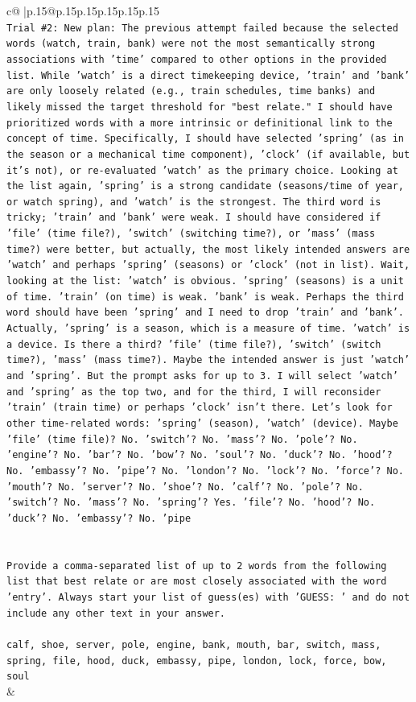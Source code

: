 \documentclass{article}
\begin{document}
{\begin{supertabular}{c@{$\;$}|p{.15\linewidth}@{}p{.15\linewidth}p{.15\linewidth}p{.15\linewidth}p{.15\linewidth}p{.15\linewidth}}
{{{\\ 
\texttt{Trial \#2: New plan: The previous attempt failed because the selected words (watch, train, bank) were not the most semantically strong associations with 'time' compared to other options in the provided list. While 'watch' is a direct timekeeping device, 'train' and 'bank' are only loosely related (e.g., train schedules, time banks) and likely missed the target threshold for "best relate." I should have prioritized words with a more intrinsic or definitional link to the concept of time. Specifically, I should have selected 'spring' (as in the season or a mechanical time component), 'clock' (if available, but it's not), or re{-}evaluated 'watch' as the primary choice. Looking at the list again, 'spring' is a strong candidate (seasons/time of year, or watch spring), and 'watch' is the strongest. The third word is tricky; 'train' and 'bank' were weak. I should have considered if 'file' (time file?), 'switch' (switching time?), or 'mass' (mass time?) were better, but actually, the most likely intended answers are 'watch' and perhaps 'spring' (seasons) or 'clock' (not in list). Wait, looking at the list: 'watch' is obvious. 'spring' (seasons) is a unit of time. 'train' (on time) is weak. 'bank' is weak. Perhaps the third word should have been 'spring' and I need to drop 'train' and 'bank'. Actually, 'spring' is a season, which is a measure of time. 'watch' is a device. Is there a third? 'file' (time file?), 'switch' (switch time?), 'mass' (mass time?). Maybe the intended answer is just 'watch' and 'spring'. But the prompt asks for up to 3. I will select 'watch' and 'spring' as the top two, and for the third, I will reconsider 'train' (train time) or perhaps 'clock' isn't there. Let's look for other time{-}related words: 'spring' (season), 'watch' (device). Maybe 'file' (time file)? No. 'switch'? No. 'mass'? No. 'pole'? No. 'engine'? No. 'bar'? No. 'bow'? No. 'soul'? No. 'duck'? No. 'hood'? No. 'embassy'? No. 'pipe'? No. 'london'? No. 'lock'? No. 'force'? No. 'mouth'? No. 'server'? No. 'shoe'? No. 'calf'? No. 'pole'? No. 'switch'? No. 'mass'? No. 'spring'? Yes. 'file'? No. 'hood'? No. 'duck'? No. 'embassy'? No. 'pipe} \\
\\ 
\\ 
\texttt{Provide a comma{-}separated list of up to 2 words from the following list that best relate or are most closely associated with the word 'entry'. Always start your list of guess(es) with 'GUESS: ' and do not include any other text in your answer.} \\
\\ 
\texttt{calf, shoe, server, pole, engine, bank, mouth, bar, switch, mass, spring, file, hood, duck, embassy, pipe, london, lock, force, bow, soul} \\
            }
        }
    }
    & \\ \\


\end{supertabular}}
\end{document}
